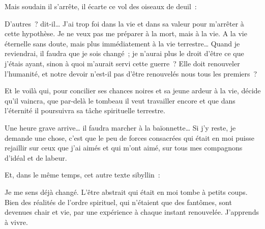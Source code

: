 \documentclass[french,twoside]{book} %
\newenvironment{quoteblock}%
  {\begin{quoting}}
  {\end{quoting}}
\newenvironment{quotebar}{%
    \def\FrameCommand{{\color{rubric!10!}\vrule width 0.5em} \hspace{0.9em}}%
    \def\OuterFrameSep{\itemsep} %
    \MakeFramed {\advance\hsize-\width \FrameRestore}
  }%
  {%
    \endMakeFramed
  }
\renewenvironment{quoteblock}%
  {%
    \savenotes
    \setstretch{0.9}
    \normalfont
    \begin{quotebar}
  }
  {%
    \end{quotebar}
    \spewnotes
  }
\begin{document}
\noindent Mais soudain il s’arrête, il écarte ce vol des oiseaux de deuil :‌\par

\begin{quoteblock}
 \noindent D’autres ? dit-il… J’ai trop foi dans la vie et dans sa valeur pour m’arrêter à cette hypothèse. Je ne veux pas me préparer à la mort, mais à la vie. A la vie éternelle sans doute, mais plus immédiatement à la vie terrestre… Quand je reviendrai, il faudra que je sois changé ; je n’aurai plus le droit d’être ce que j’étais ayant, sinon à quoi m’aurait servi cette guerre ? Elle doit renouveler l’humanité, et notre devoir n’est-il pas d’être renouvelés nous tous les premiers ?‌
 \end{quoteblock}

\noindent Et le voilà qui, pour concilier ses chances noires et sa jeune ardeur à la vie, décide qu’il vaincra, que par-delà le tombeau il veut travailler encore et que dans l’éternité il poursuivra sa tâche spirituelle terrestre.‌\par

\begin{quoteblock}
 \noindent Une heure grave arrive… il faudra marcher à la baïonnette… Si j’y reste, je demande une chose, c’est que le peu de forces consacrées qui était en moi puisse rejaillir sur ceux que j’ai aimés et qui m’ont aimé, sur tous mes compagnons d’idéal et de labeur.‌
 \end{quoteblock}

\noindent Et, dans le même temps, cet autre texte sibyllin :‌\par

\begin{quoteblock}
 \noindent Je me sens déjà changé. L’être abstrait qui était en moi tombe à petits coups. Bien des réalités de l’ordre spirituel, qui n’étaient que des fantômes, sont devenues chair et vie, par une expérience à chaque instant renouvelée. J’apprends à vivre.‌
 \end{quoteblock}
\end{document}
